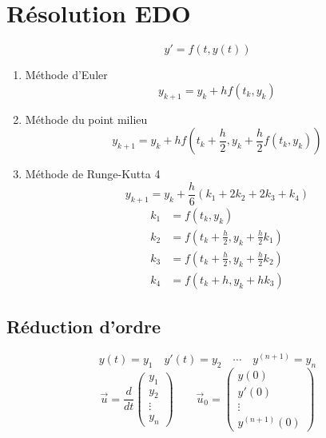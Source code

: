 \documentclass[resume]{subfiles}
\begin{document}
\section{Résolution EDO}
$$\boxed{y'=f(t,y(t))}$$
\begin{enumerate}
\item Méthode d'Euler
$$y_{k+1}=y_k+hf(t_k,y_k)$$
\item Méthode du point milieu
$$y_{k+1}=y_k+hf\left(t_k+\frac{h}{2},y_k+\frac{h}{2}f\left(t_k,y_k\right)\right)$$
\item Méthode de Runge-Kutta 4
$$y_{k+1}=y_k+\frac{h}{6}\left(k_1+2k_2+2k_3+k_4\right)$$
\begin{align*}
k_1&=f(t_k,y_k)\\
k_2&=f\left(t_k+\frac{h}{2},y_k+\frac{h}{2}k_1\right)\\
k_3&=f\left(t_k+\frac{h}{2},y_k+\frac{h}{2}k_2\right)\\
k_4&=f(t_k+h,y_k+hk_3)
\end{align*}
\end{enumerate}




\subsection{Réduction d'ordre}
$$y(t)=y_1\quad y'(t)=y_2\quad \cdots \quad y^{(n+1)}=y_{n}$$
$$\vec{u}=\frac{d}{dt}\begin{pmatrix}
y_1\\
y_2\\
\vdots\\
y_n
\end{pmatrix}\qquad \vec{u}_0=\begin{pmatrix}
y(0)\\
y'(0)\\
\vdots\\
y^{(n+1)}(0)
\end{pmatrix}$$
\end{document}
